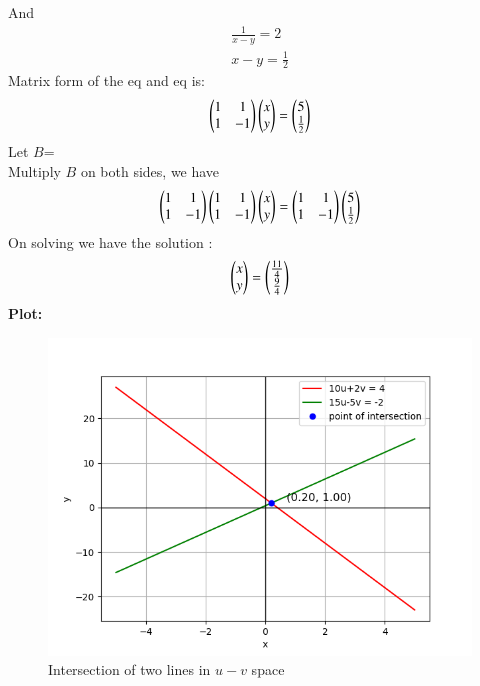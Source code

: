 \documentclass[journal]{IEEEtran}
\begin{document}
And
\begin{align}
    \frac{1}{x-y}=2\\x-y=\frac{1}{2}
\end{align}
Matrix form of the eq and eq is:
\begin{align}
    \begin{pmatrix}1 & 1 \\ 1 & -1\end{pmatrix}\begin{pmatrix}x\\y\end{pmatrix}=\begin{pmatrix}5 \\ \frac{1}{2}\end{pmatrix}
\end{align}
Let $B$=\\
Multiply $B$ on both sides, we have
\begin{align}
    \begin{pmatrix}1 & 1 \\ 1 & -1\end{pmatrix}\begin{pmatrix}1 & 1 \\ 1 & -1\end{pmatrix}\begin{pmatrix}x \\ y\end{pmatrix} = \begin{pmatrix}1 & 1 \\ 1 & -1\end{pmatrix}\begin{pmatrix}5 \\ \frac{1}{2}\end{pmatrix}
\end{align}
On solving we have the solution :
\begin{align}
    \begin{pmatrix}x \\ y\end{pmatrix}=\begin{pmatrix}\frac{11}{4} \\ \frac{9}{4}\end{pmatrix}
\end{align}
\textbf{Plot:}\\
\begin{figure}[h!]
   \centering
   \includegraphics[width=1\columnwidth]{figs/fig.png}
   \caption{Intersection of two lines in $u-v$ space}
\end{figure}
\end{document}
